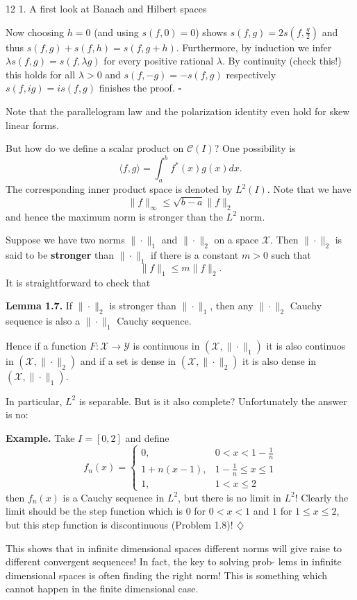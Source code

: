 12 \hfill 1. A first look at Banach and Hilbert spaces

Now choosing $h=0$ (and using $s(f,0) = 0$) shows $s(f,g) = 2s(f,\frac{g}{2})$ and
thus $s(f,g) + s(f,h) = s(f,g+h)$. Furthermore, by induction we infer
$\lambda s(f,g) = s(f, \lambda g)$ for every positive rational $\lambda$.
By continuity (check this!) this holds for all $\lambda > 0$ and $s(f,-g) = -s(f,g)$
respectively $s(f, ig) = is(f,g)$ finishes the proof. $\square$

Note that the parallelogram law and the polarization identity even hold
for skew linear forms.

But how do we define a scalar product on $\mathcal{C}(I)$? One possibility is
\[
\langle f,g \rangle = \int_a^b f^*(x)g(x)dx.
\tag{1.32}
\]
The corresponding inner product space is denoted by $L^2(I)$. Note that we
have
\[
\|f\|_\infty \leq \sqrt{b-a} \|f\|_2
\tag{1.33}
\]
and hence the maximum norm is stronger than the $L^2$ norm.

Suppose we have two norms $\|\cdot\|_1$ and $\|\cdot\|_2$ on a space $\mathcal{X}$. Then $\|\cdot\|_2$ is
said to be \textbf{stronger} than $\|\cdot\|_1$ if there is a constant $m > 0$ such that
\[
\|f\|_1 \leq m \|f\|_2.
\tag{1.34}
\]
It is straightforward to check that

\noindent\textbf{Lemma 1.7.} If $\|\cdot\|_2$ is stronger than $\|\cdot\|_1$, then any $\|\cdot\|_2$ Cauchy sequence
is also a $\|\cdot\|_1$ Cauchy sequence.

Hence if a function $F: \mathcal{X} \to \mathcal{Y}$ is continuous in $(\mathcal{X}, \|\cdot\|_1)$ it is also
continuos in $(\mathcal{X}, \|\cdot\|_2)$ and if a set is dense in $(\mathcal{X}, \|\cdot\|_2)$ it is also dense in
$(\mathcal{X}, \|\cdot\|_1)$.

In particular, $L^2$ is separable. But is it also complete? Unfortunately
the answer is no:

\noindent\textbf{Example.} Take $I = [0, 2]$ and define
\[
f_n(x) = \begin{cases}
0, & 0<x<1-\frac{1}{n} \\
1 + n(x-1), & 1-\frac{1}{n}\leq x \leq 1 \\
1, & 1 < x \leq 2
\end{cases}
\tag{1.35}
\]
then $f_n(x)$ is a Cauchy sequence in $L^2$, but there is no limit in $L^2$! Clearly
the limit should be the step function which is $0$ for $0 < x < 1$ and $1$ for
$1 \leq x \leq 2$, but this step function is discontinuous (Problem 1.8)! $\diamondsuit$

This shows that in infinite dimensional spaces different norms will give
raise to different convergent sequences! In fact, the key to solving prob-
lems in infinite dimensional spaces is often finding the right norm! This is
something which cannot happen in the finite dimensional case.